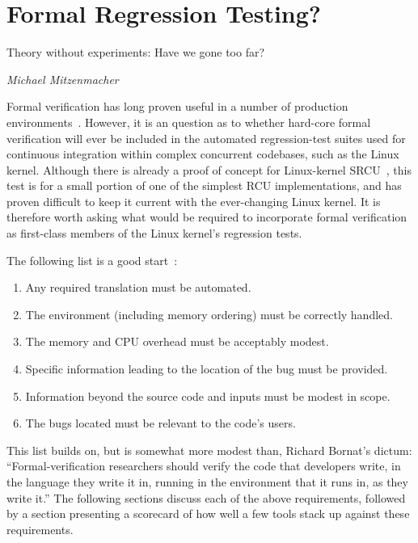 
\section{Formal Regression Testing?}
\label{sec:future:Formal Regression Testing?}
%
\epigraph{Theory without experiments: Have we gone too far?}
	 {\emph{Michael Mitzenmacher}}

Formal verification has long proven useful in a number of production
environments~\cite{JamesRLarus2004RightingSoftware,AlBessey2010BillionLoCLater,ByronCook2018FormalAmazon,CaitlinSadowski2018staticAnalysisGoogle,DinoDistefano2019FBstaticAnalysis}.
However, it is an question as to whether hard-core formal verification
will ever be included in the automated regression-test suites used for
continuous integration within complex concurrent codebases, such as the
Linux kernel.
Although there is already a proof of concept for Linux-kernel
SRCU~\cite{LanceRoy2017CBMC-SRCU}, this test is for a small portion
of one of the simplest RCU implementations, and has proven difficult
to keep it current with the ever-changing Linux kernel.
It is therefore worth asking what would be required to incorporate
formal verification as first-class members of the Linux kernel's
regression tests.

The following list is a good
start~\cite[slide 34]{PaulEMcKenney2015DagstuhlVerification}:

\begin{enumerate}
\item	Any required translation must be automated.
\item	The environment (including memory ordering) must be correctly
	handled.
\item	The memory and CPU overhead must be acceptably modest.
\item	Specific information leading to the location of the bug
	must be provided.
\item	Information beyond the source code and inputs must be
	modest in scope.
\item	The bugs located must be relevant to the code's users.
\end{enumerate}

This list builds on, but is somewhat more modest than, Richard Bornat's
dictum: ``Formal-verification researchers should verify the code that
developers write, in the language they write it in, running in the
environment that it runs in, as they write it.''
The following sections discuss each of the above requirements, followed
by a section presenting a scorecard of how well a few tools stack up
against these requirements.

